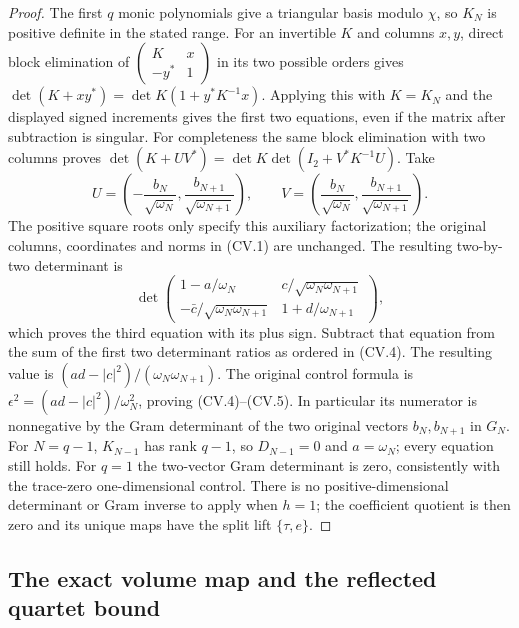 \begin{proof}
The first $q$ monic polynomials give a triangular basis modulo $\chi$,
so $K_N$ is positive definite in the stated range. For an invertible
$K$ and columns $x,y$, direct block elimination of
$\left(\begin{smallmatrix}K&x\\-y^*&1\end{smallmatrix}\right)$
in its two possible orders gives
$\det(K+xy^*)=\det K(1+y^*K^{-1}x)$.
Applying this with $K=K_N$ and the displayed signed increments gives
the first two equations, even if the matrix after subtraction is singular.
For completeness the same block elimination with two columns proves
$\det(K+UV^*)=\det K\det(I_2+V^*K^{-1}U)$.
Take
\[
 U=\left(-\frac{b_N}{\sqrt{\omega_N}},
            \frac{b_{N+1}}{\sqrt{\omega_{N+1}}}\right),\qquad
 V=\left(\frac{b_N}{\sqrt{\omega_N}},
            \frac{b_{N+1}}{\sqrt{\omega_{N+1}}}\right).
\]
The positive square roots only specify this auxiliary factorization;
the original columns, coordinates and norms in (CV.1) are unchanged.
The resulting two-by-two determinant is
\[
 \det\begin{pmatrix}
 1-a/\omega_N&c/\sqrt{\omega_N\omega_{N+1}}\\
 -\bar c/\sqrt{\omega_N\omega_{N+1}}&1+d/\omega_{N+1}
 \end{pmatrix},
\]
which proves the third equation with its plus sign.
Subtract that equation from the sum of the first two determinant ratios
as ordered in (CV.4). The resulting value is
$(ad-|c|^2)/(\omega_N\omega_{N+1})$.
The original control formula is
$\epsilon^2=(ad-|c|^2)/\omega_N^2$, proving (CV.4)--(CV.5).
In particular its numerator is nonnegative by the Gram determinant
of the two original vectors $b_N,b_{N+1}$ in $G_N$.
For $N=q-1$, $K_{N-1}$ has rank $q-1$, so $D_{N-1}=0$ and
$a=\omega_N$; every equation still holds. For $q=1$ the two-vector
Gram determinant is zero, consistently with the trace-zero
one-dimensional control. There is no positive-dimensional determinant
or Gram inverse to apply when $h=1$; the coefficient quotient is then
zero and its unique maps have the split lift $\{\tau,e\}$.
\end{proof}

\subsection{The exact volume map and the reflected quartet bound}

